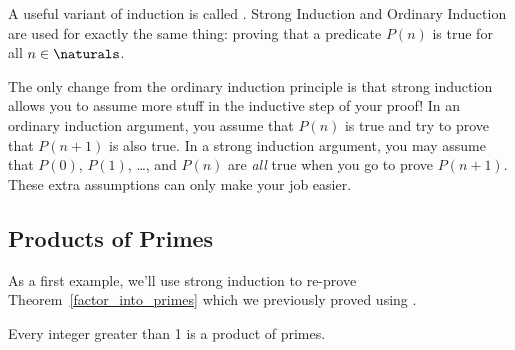 A useful variant of induction is called .  Strong
Induction and Ordinary Induction are used for exactly the same thing:
proving that a predicate $P(n)$ is true for all $n \in \naturals$.


The only change from the ordinary induction principle is that strong
induction allows you to assume more stuff in the inductive step of your
proof!  In an ordinary induction argument, you assume that $P(n)$ is true
and try to prove that $P(n+1)$ is also true.  In a strong induction
argument, you may assume that $P(0)$, $P(1)$, \dots, and $P(n)$ are
\emph{all} true when you go to prove $P(n+1)$.  These extra assumptions
can only make your job easier.

\subsection{Products of Primes}

As a first example, we'll use strong induction to re-prove
Theorem~\ref{factor_into_primes} which we previously proved using .

\begin{lemma}\label{prim}
Every integer greater than 1 is a product of primes.
\end{lemma}

